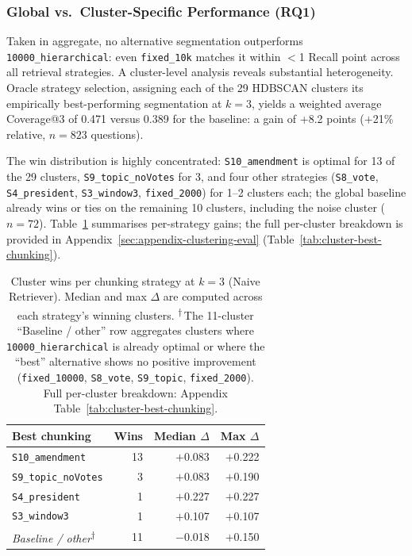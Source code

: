 \subsubsection{Global vs.\ Cluster-Specific Performance (\textbf{RQ1})}
\label{sec:indexing-global}

Taken in aggregate, no alternative segmentation outperforms \texttt{10000\_hierarchical}:
even \texttt{fixed\_10k} matches it within $<$1 Recall point across all retrieval strategies.
A cluster-level analysis reveals substantial heterogeneity.
Oracle strategy selection, assigning each of the 29 HDBSCAN clusters its
empirically best-performing segmentation at $k{=}3$, yields a weighted average Coverage@3 of 0.471 versus 0.389 for the baseline:
a gain of +8.2 points ($+$21\% relative, $n{=}823$ questions).

The win distribution is highly concentrated: \texttt{S10\_amendment} is optimal
for 13 of the 29 clusters, \texttt{S9\_topic\_noVotes} for 3, and four other
strategies (\texttt{S8\_vote}, \texttt{S4\_president}, \texttt{S3\_window3},
\texttt{fixed\_2000}) for 1--2 clusters each;
the global baseline already wins or ties on the remaining 10 clusters,
including the noise cluster ($n{=}72$).
Table~\ref{tab:chunking-wins-summary} summarises per-strategy gains;
the full per-cluster breakdown is provided in
Appendix~\ref{sec:appendix-clustering-eval}
(Table~\ref{tab:cluster-best-chunking}).

\begin{table}[htbp]
\centering
\small
\setlength{\tabcolsep}{4pt}
\begin{tabular}{l r r r}
\toprule
\textbf{Best chunking} & \textbf{Wins} & \textbf{Median $\Delta$} & \textbf{Max $\Delta$} \\
\midrule
\texttt{S10\_amendment}     & 13 & $+$0.083 & $+$0.222 \\
\texttt{S9\_topic\_noVotes} &  3 & $+$0.083 & $+$0.190 \\
\texttt{S4\_president}       &  1 & $+$0.227 & $+$0.227 \\
\texttt{S3\_window3}         &  1 & $+$0.107 & $+$0.107 \\
\midrule
\textit{Baseline / other}\textsuperscript{$\dagger$}    & 11 & $-$0.018 & $+$0.150 \\
\bottomrule
\end{tabular}
\caption{Cluster wins per chunking strategy at $k{=}3$ (Naive Retriever).
Median and max $\Delta$ are computed across each strategy's winning clusters.
\textsuperscript{$\dagger$}\,The 11-cluster ``Baseline / other'' row aggregates clusters where
\texttt{10000\_hierarchical} is already optimal or where the
``best'' alternative shows no positive improvement (\texttt{fixed\_10000},
\texttt{S8\_vote}, \texttt{S9\_topic}, \texttt{fixed\_2000}).
Full per-cluster breakdown: Appendix Table~\ref{tab:cluster-best-chunking}.}
\label{tab:chunking-wins-summary}
\end{table}

